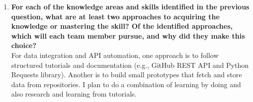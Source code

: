 \begin{enumerate}
{  or presentation, or team management, etc.  You should look to identify at
  least one item for each team member.} \\
  Our team needs to strengthen technical skills in data integration through APIs, backend development with Flask, and interactive visualization using React or Plotly. We also need to refine project management and documentation practices to ensure smooth collaboration as the project becomes more technical.
  \item \textbf{For each of the knowledge areas and skills identified in the previous
  question, what are at least two approaches to acquiring the knowledge or
  mastering the skill?  Of the identified approaches, which will each team
  member pursue, and why did they make this choice?} \\
  For data integration and API automation, one approach is to follow structured tutorials and documentation (e.g., GitHub REST API and Python Requests library). Another is to build small prototypes that fetch and store data from repositories. I plan to do a combination of learning by doing and also research and learning from tutorials.
\end{enumerate}

